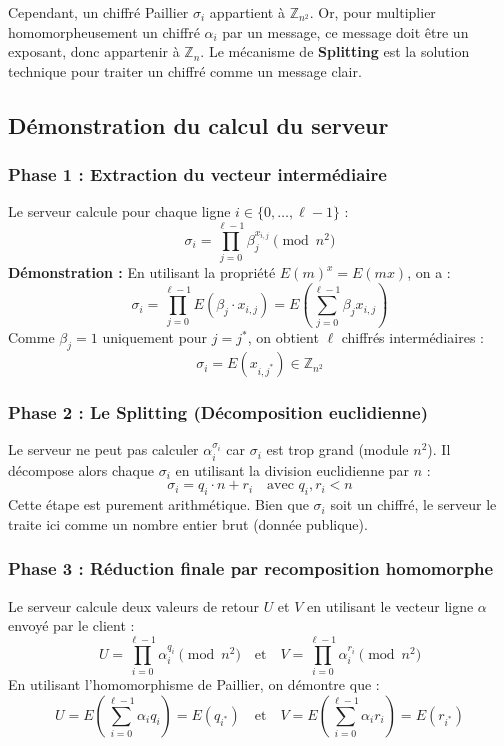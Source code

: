\documentclass[12pt,a4paper]{report}
\begin{document}
Cependant, un chiffré Paillier $\sigma_i$ appartient à $\mathbb{Z}_{n^2}$. Or, pour multiplier homomorpheusement un chiffré $\alpha_i$ par un message, ce message doit être un exposant, donc appartenir à $\mathbb{Z}_n$. Le mécanisme de \textbf{Splitting} est la solution technique pour traiter un chiffré comme un message clair.

\subsection{Démonstration du calcul du serveur}

\subsubsection{Phase 1 : Extraction du vecteur intermédiaire}
Le serveur calcule pour chaque ligne $i \in \{0, \dots, \ell-1\}$ :
\[ \sigma_i = \prod_{j=0}^{\ell-1} \beta_j^{x_{i,j}} \pmod{n^2} \]
\textbf{Démonstration :} En utilisant la propriété $E(m)^x = E(mx)$, on a :
\[ \sigma_i = \prod_{j=0}^{\ell-1} E(\beta_j \cdot x_{i,j}) = E\left( \sum_{j=0}^{\ell-1} \beta_j x_{i,j} \right) \]
Comme $\beta_j=1$ uniquement pour $j=j^*$, on obtient $\ell$ chiffrés intermédiaires :
\[ \sigma_i = E(x_{i, j^*}) \in \mathbb{Z}_{n^2} \]

\subsubsection{Phase 2 : Le Splitting (Décomposition euclidienne)}
Le serveur ne peut pas calculer $\alpha_i^{\sigma_i}$ car $\sigma_i$ est trop grand (module $n^2$). Il décompose alors chaque $\sigma_i$ en utilisant la division euclidienne par $n$ :
\[ \sigma_i = q_i \cdot n + r_i \quad \text{avec } q_i, r_i < n \]
Cette étape est purement arithmétique. Bien que $\sigma_i$ soit un chiffré, le serveur le traite ici comme un nombre entier brut (donnée publique).

\subsubsection{Phase 3 : Réduction finale par recomposition homomorphe}
Le serveur calcule deux valeurs de retour $U$ et $V$ en utilisant le vecteur ligne $\alpha$ envoyé par le client :
\[ U = \prod_{i=0}^{\ell-1} \alpha_i^{q_i} \pmod{n^2} \quad \text{et} \quad V = \prod_{i=0}^{\ell-1} \alpha_i^{r_i} \pmod{n^2} \]
En utilisant l'homomorphisme de Paillier, on démontre que :
\[ U = E\left( \sum_{i=0}^{\ell-1} \alpha_i q_i \right) = E(q_{i^*}) \quad \text{et} \quad V = E\left( \sum_{i=0}^{\ell-1} \alpha_i r_i \right) = E(r_{i^*}) \]
\end{document}
